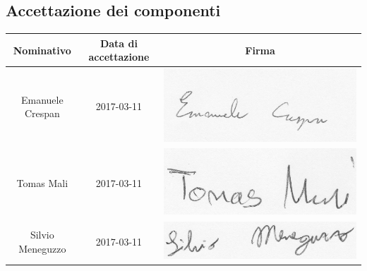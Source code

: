 \subsection{Accettazione dei componenti}

\begin{center}
	\centering
	\begin{tabular}{|c|c|c|}
		\hline
		\textbf{Nominativo} & \textbf{Data di accettazione} & \textbf{Firma} \\
		\hline Emanuele Crespan & 2017-03-11 &  
    \begin{minipage}{.3\textwidth}
      \includegraphics[width=\linewidth]{../../../file_comuni/firme/ec.jpg}
    \end{minipage}\\
		\hline Tomas Mali & 2017-03-11 & 
    \begin{minipage}{.3\textwidth}
      \includegraphics[width=\linewidth]{../../../file_comuni/firme/tm.jpg}
    \end{minipage} \\
		\hline Silvio Meneguzzo & 2017-03-11 &    
 \begin{minipage}{.3\textwidth}
      \includegraphics[width=\linewidth]{../../../file_comuni/firme/sm.jpg}
    \end{minipage} \\

\end{tabular}
\end{center}
